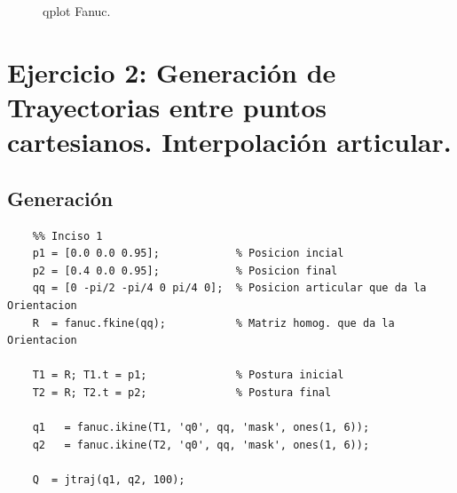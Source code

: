 \documentclass[a4paper,12pt]{article}
\begin{document}
\begin{figure}[H]
    \centering
    \begin{adjustbox}{scale = 0.65, max width=\columnwidth}
    \end{adjustbox}
    \caption{qplot Fanuc.}
    \label{qplot fanuc}
\end{figure}

\section{Ejercicio 2: Generación de Trayectorias entre puntos cartesianos. Interpolación articular.}
\subsection{Generación}
\begin{lstlisting}
    %% Inciso 1
    p1 = [0.0 0.0 0.95];            % Posicion incial
    p2 = [0.4 0.0 0.95];            % Posicion final
    qq = [0 -pi/2 -pi/4 0 pi/4 0];  % Posicion articular que da la Orientacion
    R  = fanuc.fkine(qq);           % Matriz homog. que da la Orientacion

    T1 = R; T1.t = p1;              % Postura inicial
    T2 = R; T2.t = p2;              % Postura final

    q1   = fanuc.ikine(T1, 'q0', qq, 'mask', ones(1, 6));
    q2   = fanuc.ikine(T2, 'q0', qq, 'mask', ones(1, 6));

    Q  = jtraj(q1, q2, 100);
\end{lstlisting}
\end{document}
